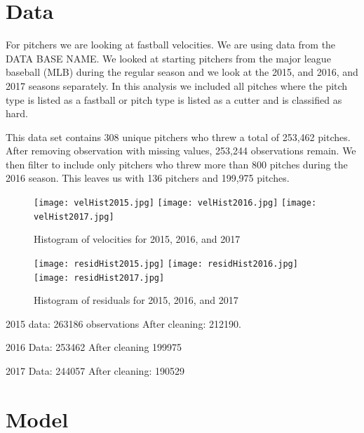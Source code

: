 \documentclass[letterpaper,12pt]{article}\usepackage[]{graphicx}\usepackage[]{color}
\begin{document}
\cite{Altman2007}
\cite{MeedenAndVardeman1997}


\section{Data}
For pitchers we are looking at fastball velocities.  We are using data from the DATA BASE NAME.  We looked at  starting pitchers from the major league baseball (MLB) during the regular season and we look at the 2015, and 2016, and 2017 seasons separately.  In this analysis we included all pitches where the pitch type is listed as a fastball or pitch type is listed as a cutter and is classified as hard. 

This data set contains 308 unique pitchers who threw a total of 253,462 pitches.  After removing observation with missing values, 253,244 observations remain.  We then filter to include only pitchers who threw more than 800 pitches during the 2016 season.  This leaves us with 136 pitchers and 199,975 pitches.  



\begin{figure}[ht]
		\texttt{[image: velHist2015.jpg]}
		\texttt{[image: velHist2016.jpg]}
	\texttt{[image: velHist2017.jpg]}

	  \caption{Histogram of velocities for 2015, 2016, and 2017}
  \label{acf}
\end{figure}


\begin{figure}[ht]
		\texttt{[image: residHist2015.jpg]}
		\texttt{[image: residHist2016.jpg]}
	\texttt{[image: residHist2017.jpg]}
	  \caption{Histogram of residuals for 2015, 2016, and 2017}
  \label{acf}
\end{figure}

2015 data: 263186 observations
After cleaning:  212190.  

2016 Data: 253462
After cleaning 199975


2017 Data: 244057
After cleaning: 190529




\section{Model}
\end{document}
